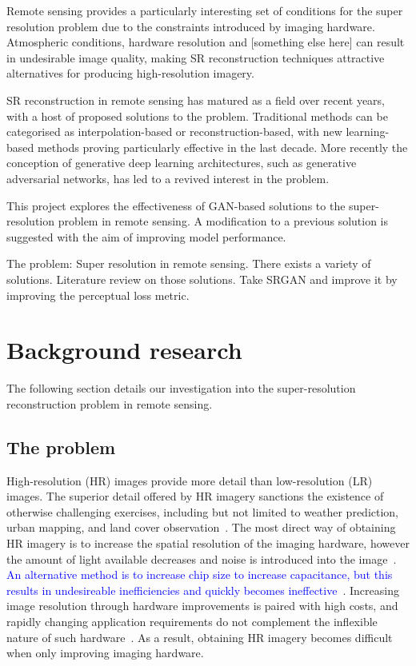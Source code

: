 Remote sensing provides a particularly interesting set of conditions for the super resolution problem due to the constraints introduced by imaging hardware. Atmospheric conditions, hardware resolution and [something else here] can result in undesirable image quality, making SR reconstruction techniques attractive alternatives for producing high-resolution imagery.

SR reconstruction in remote sensing has matured as a field over recent years, with a host of proposed solutions to the problem. Traditional methods can be categorised as interpolation-based or reconstruction-based, with new learning-based methods proving particularly effective in the last decade. More recently the conception of generative deep learning architectures, such as generative adversarial networks, has led to a revived interest in the problem.

This project explores the effectiveness of GAN-based solutions to the super-resolution problem in remote sensing. A modification to a previous solution is suggested with the aim of improving model performance.

The problem: Super resolution in remote sensing. There exists a variety of solutions. Literature review on those solutions. Take SRGAN and improve it by improving the perceptual loss metric.

\clearpage
\section{Background research}\label{sec:background_research}
The following section details our investigation into the super-resolution reconstruction problem in remote sensing.

\subsection{The problem}\label{subsec:the_problem}
High-resolution (HR) images provide more detail than low-resolution (LR) images. The superior detail offered by HR imagery sanctions the existence of otherwise challenging exercises, including but not limited to weather prediction, urban mapping, and land cover observation~\cite{urbanMapping, mapping, cloudCover, vegetationMapping}. The most direct way of obtaining HR imagery is to increase the spatial resolution of the imaging hardware, however the amount of light available decreases and noise is introduced into the image~\cite{superResOverview}. \textcolor{blue}{An alternative method is to increase chip size to increase capacitance, but this results in undesireable inefficiencies and quickly becomes ineffective~\cite{superResOverview}}. Increasing image resolution through hardware improvements is paired with high costs, and rapidly changing application requirements do not complement the inflexible nature of such hardware~\cite{ref}. As a result, obtaining HR imagery becomes difficult when only improving imaging hardware.

